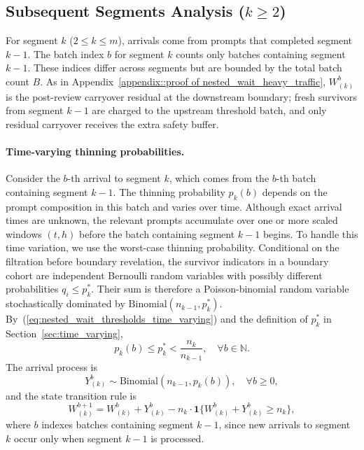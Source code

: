 \subsection{Subsequent Segments Analysis ($k \geq 2$)}

For segment $k$ ($2\leq k\leq m$), arrivals come from prompts that completed segment $k-1$. The batch index $b$ for segment $k$ counts only batches containing segment $k-1$. These indices differ across segments but are bounded by the total batch count $B$. As in Appendix~\ref{appendix::proof of nested_wait_heavy_traffic}, \(W^b_{(k)}\) is the post-review carryover residual at the downstream boundary; fresh survivors from segment \(k-1\) are charged to the upstream threshold batch, and only residual carryover receives the extra safety buffer.

\paragraph{Time-varying thinning probabilities.} Consider the $b$-th arrival to segment $k$, which comes from the $b$-th batch containing segment $k-1$. The thinning probability $p_k(b)$ depends on the prompt composition in this batch and varies over time. Although exact arrival times are unknown, the relevant prompts accumulate over one or more scaled windows \((t,h)\) before the batch containing segment \(k-1\) begins. To handle this time variation, we use the worst-case thinning probability. Conditional on the filtration before boundary revelation, the survivor indicators in a boundary cohort are independent Bernoulli random variables with possibly different probabilities \(q_i\le p_k^*\). Their sum is therefore a Poisson-binomial random variable stochastically dominated by \(\mathrm{Binomial}(n_{k-1},p_k^*)\). By~(\ref{eq:nested_wait_thresholds_time_varying}) and the definition of \(p_k^*\) in Section~\ref{sec:time_varying},
$$p_k(b) \leq p_k^* < \frac{n_k}{n_{k-1}}, \quad \forall b \in \mathbb{N}.$$
The arrival process is
$$Y_{(k)}^b \sim \text{Binomial}(n_{k-1},p_k(b)),\quad \forall b\geq 0,$$
and the state transition rule is
$$W_{(k)}^{b+1} = W_{(k)}^{b} + Y_{(k)}^{b} - n_k \cdot\mathbf{1}\{ W_{(k)}^{b} + Y_{(k)}^{b}\geq n_k \}, $$
where $b$ indexes batches containing segment $k-1$, since new arrivals to segment $k$ occur only when segment $k-1$ is processed.

